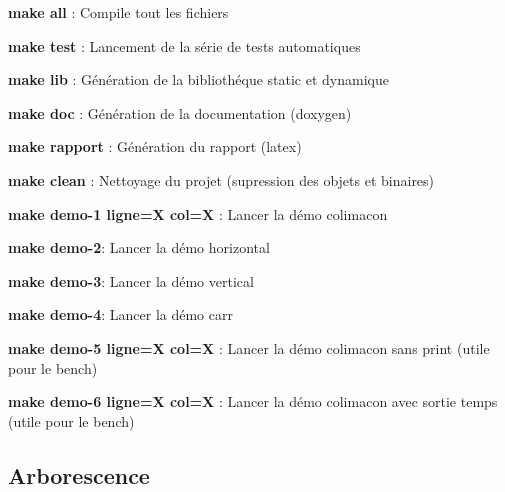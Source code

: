 
\begin{DoxyItemize}
\item {\bfseries make all} \+: Compile tout les fichiers
\item {\bfseries make test} \+: Lancement de la série de tests automatiques
\item {\bfseries make lib} \+: Génération de la bibliothéque static et dynamique
\item {\bfseries make doc} \+: Génération de la documentation (doxygen)
\item {\bfseries make rapport} \+: Génération du rapport (latex)
\item {\bfseries make clean} \+: Nettoyage du projet (supression des objets et binaires)
\item {\bfseries make demo-\/1 ligne=X col=X} \+: Lancer la démo colimacon
\item {\bfseries make demo-\/2}\+: Lancer la démo horizontal
\item {\bfseries make demo-\/3}\+: Lancer la démo vertical
\item {\bfseries make demo-\/4}\+: Lancer la démo carr
\item {\bfseries make demo-\/5 ligne=X col=X} \+: Lancer la démo colimacon sans print (utile pour le bench)
\item {\bfseries make demo-\/6 ligne=X col=X} \+: Lancer la démo colimacon avec sortie temps (utile pour le bench)
\end{DoxyItemize}

\subsection*{Arborescence}


